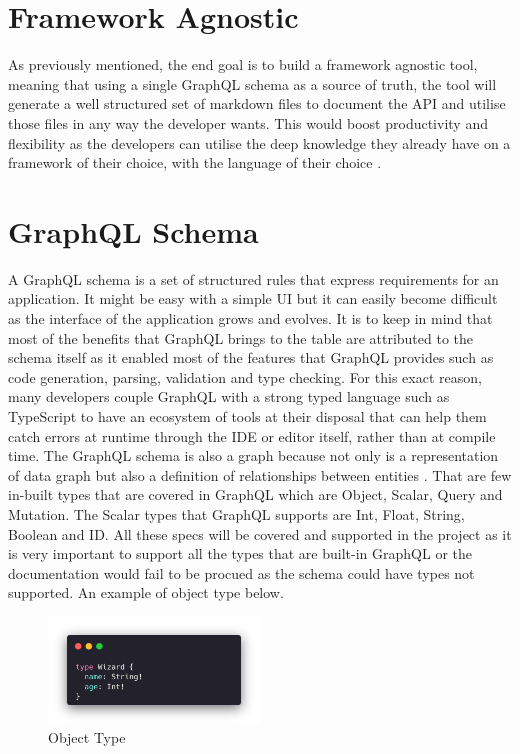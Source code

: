 \section{Framework Agnostic}
\label{s:Framework Agnostic}
As previously mentioned, the end goal is to build a framework agnostic tool,
meaning that using a single GraphQL schema as a source of truth, the tool will
generate a well structured set of markdown files to document the API and utilise
those files in any way the developer wants. This would boost productivity and
flexibility as the developers can utilise the deep knowledge they already have
on a framework of their choice, with the language of their choice \citep{
stefanReasonsWhyWent2018}.

\section{GraphQL Schema}
\label{s:Literature-GraphQLSchema}
A GraphQL schema is a set of structured rules that express requirements for an
application. It might be easy with a simple UI but it can easily become
difficult as the interface of the application grows and evolves. It is to keep
in mind that most of the benefits that GraphQL brings to the table are
attributed to the schema itself as it enabled most of the features that GraphQL
provides such as code generation, parsing, validation and type checking. For
this exact reason, many developers couple GraphQL with a strong typed language
such as TypeScript to have an ecosystem of tools at their disposal that can help
them catch errors at runtime through the IDE or editor itself, rather than at
compile time. The GraphQL schema is also a graph because not only is a
representation of data graph but also a definition of relationships between
entities \citep{karthicDesigningGraphQLSchemas2020}. That are few in-built
types that are covered in GraphQL which are Object, Scalar, Query and Mutation.
The Scalar types that GraphQL supports are Int, Float, String, Boolean and ID.
All these specs will be covered and supported in the project as it is very
important to support all the types that are built-in GraphQL or the
documentation would fail to be procued as the schema could have types not
supported. An example of object type below.

\begin{figure}[H]
  \centering
  \includegraphics[width=0.5\textwidth]{figures/code/wizard}
  \caption{Object Type}
  \label{f:Wizard-Object}
\end{figure}

